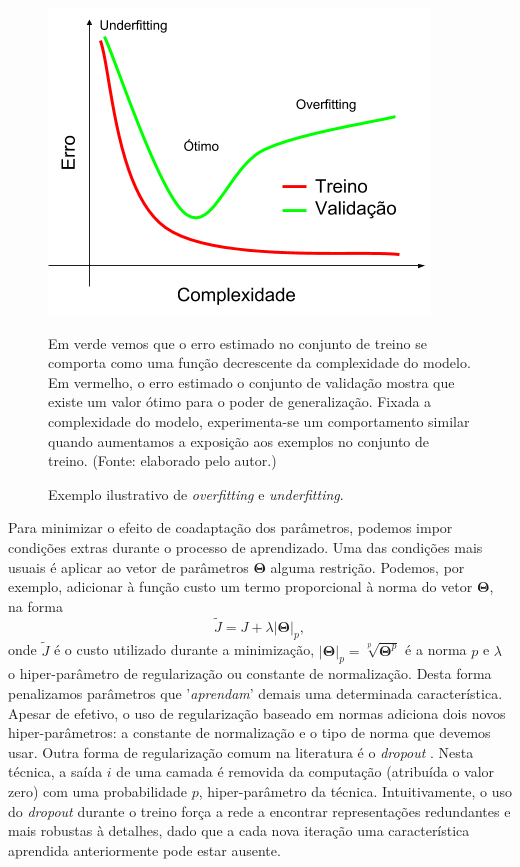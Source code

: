 \begin{figure}[ht]
	\caption{Exemplo ilustrativo de \textit{overfitting} e \textit{underfitting}.}
 	\begin{center}
	\includegraphics[width=.6\linewidth]{figuras/overfitting.png}
	\end{center}
	\small Em verde vemos que o erro estimado no conjunto de treino se comporta como uma função decrescente da complexidade do modelo. Em vermelho, o erro estimado o conjunto de validação mostra que existe um valor ótimo para o poder de generalização. Fixada a complexidade do modelo, experimenta-se um comportamento similar quando aumentamos a exposição aos exemplos no conjunto de treino. (Fonte: elaborado pelo autor.)
	\label{overfit}
\end{figure}

Para minimizar o efeito de coadaptação dos parâmetros, podemos impor condições extras durante o processo de aprendizado. Uma das condições mais usuais é aplicar ao vetor de parâmetros $\mathbf{\Theta}$ alguma restrição. Podemos, por exemplo, adicionar à função custo um termo proporcional à norma do vetor $\mathbf{\Theta}$, na forma
\begin{equation}
\tilde{J} = J + \lambda \left| \mathbf{\Theta} \right|_p,
\end{equation}
onde $\tilde{J}$ é o custo utilizado durante a minimização, $\left| \mathbf{\Theta} \right|_p = \sqrt[p]{\mathbf{\Theta}^p}$ é a norma $p$ e $\lambda$ o hiper-parâmetro de regularização ou constante de normalização. Desta forma penalizamos parâmetros que '\textit{aprendam}' demais uma determinada característica. Apesar de efetivo, o uso de regularização baseado em normas adiciona dois novos hiper-parâmetros: a constante de normalização e o tipo de norma que devemos usar. Outra forma de regularização comum na literatura é o \textit{dropout} \cite{hinton2012improving}. Nesta técnica, a saída $i$ de uma camada é removida da computação (atribuída o valor zero) com uma probabilidade $p$, hiper-parâmetro da técnica. Intuitivamente, o uso do \textit{dropout} durante o treino força a rede a encontrar representações redundantes e mais robustas à detalhes, dado que a cada nova iteração uma característica aprendida anteriormente pode estar ausente.


